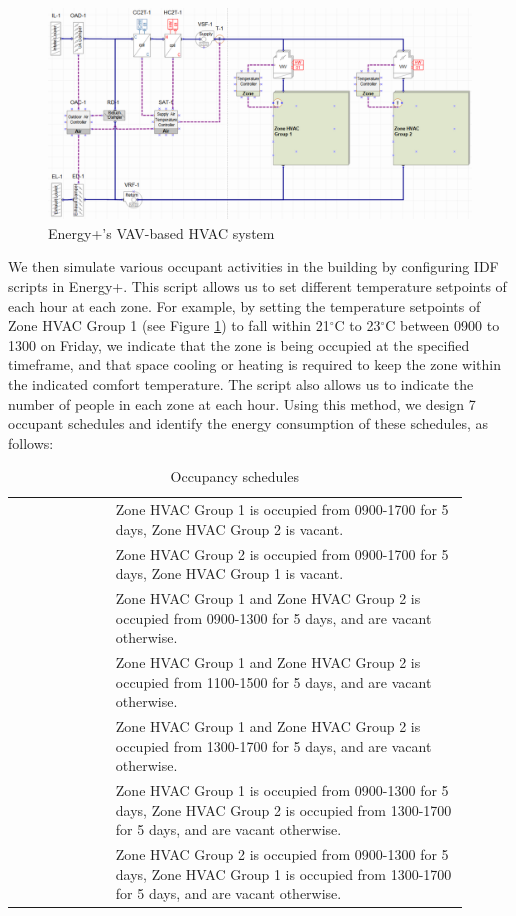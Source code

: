 \begin{figure}
	\centering
		\includegraphics[width=0.9\linewidth,keepaspectratio]{./figs/app_hvac.png}		
	\caption{Energy+'s VAV-based HVAC system}
	\label{fig:epvav}
\end{figure}

We then simulate various occupant activities in the building by configuring IDF scripts in Energy+. This script allows us to set different temperature setpoints of each hour at each zone. For example, by setting the temperature setpoints of Zone HVAC Group 1 (see Figure \ref{fig:epvav}) to fall within 21$^\circ$C to 23$^\circ$C between 0900 to 1300 on Friday, we indicate that the zone is being occupied at the specified timeframe, and that space cooling or heating is required to keep the zone within the indicated comfort temperature. The script also allows us to indicate the number of people in each zone at each hour. Using this method, we design 7 occupant schedules and identify the energy consumption of these schedules, as follows:

\begin{table}[t]
\centering
\begin{tabular}{p{0.2\linewidth} p{0.7\linewidth}}
\hline \centering{Schedule Types} & {\centering{Schedule Description}} \tabularnewline       
\hline \centering{S1} & Zone HVAC Group 1 is occupied from 0900-1700 for 5 days, Zone HVAC Group 2 is vacant. \tabularnewline
\hline \centering{S2} & Zone HVAC Group 2 is occupied from 0900-1700 for 5 days, Zone HVAC Group 1 is vacant. \tabularnewline
\hline \centering{S3} & Zone HVAC Group 1 and Zone HVAC Group 2 is occupied from 0900-1300 for 5 days, and are vacant otherwise. \tabularnewline
\hline \centering{S4} & Zone HVAC Group 1 and Zone HVAC Group 2 is occupied from 1100-1500 for 5 days, and are vacant otherwise. \tabularnewline
\hline \centering{S5} & Zone HVAC Group 1 and Zone HVAC Group 2 is occupied from 1300-1700 for 5 days, and are vacant otherwise. \tabularnewline
\hline \centering{S6} & Zone HVAC Group 1 is occupied from 0900-1300 for 5 days, Zone HVAC Group 2 is occupied from 1300-1700 for 5 days, and are vacant otherwise. \tabularnewline
\hline \centering{S7} & Zone HVAC Group 2 is occupied from 0900-1300 for 5 days, Zone HVAC Group 1 is occupied from 1300-1700 for 5 days, and are vacant otherwise. \tabularnewline
\end{tabular}
	\caption{Occupancy schedules}
	\label{tab:app_sche}
\end{table}

